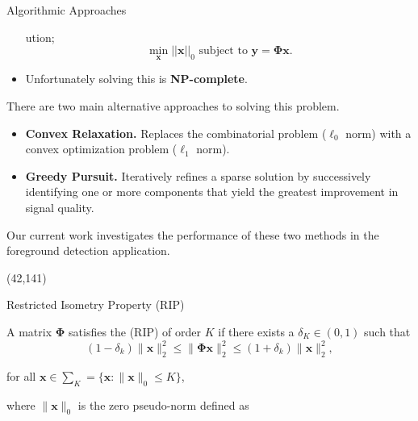 \documentclass[final]{beamer}
\begin{document}
\begin{frame}{}
\begin{textblock}{36}
\begin{block}{Algorithmic Approaches}
\begin{itemize}
ution;  
\begin{equation*}
  \label{eq:4}
 \min_{\boldsymbol{x}} ||\boldsymbol{x}||_0 \text{ subject to } \boldsymbol{y} = \boldsymbol{\Phi} \boldsymbol{x}.
\end{equation*}


\item Unfortunately solving this is \textcolor{likePurple}{\textbf{NP-complete}}.
\end{itemize}

\vspace{1cm}

There are two main alternative approaches to solving this problem. 
\begin{itemize}
\item \textcolor{likePurple}{\textbf{Convex Relaxation. }}
\newline Replaces the combinatorial problem ($\ell_0$ norm) with a convex optimization problem  ($\ell_1$ norm).  

\item \textcolor{likePurple}{\textbf{Greedy Pursuit.}}
\newline Iteratively refines a sparse solution by successively identifying one or more components that yield the greatest improvement in signal quality.
\end{itemize}

\vspace{1.5cm}
Our current work investigates the performance of these two methods in the foreground detection application. 
  \end{block}
\end{textblock}

\begin{textblock}{36}(42,141)
  \begin{block}{Restricted Isometry Property (RIP)}
     
 A matrix $\boldsymbol{\Phi}$ satisfies the (RIP) of order $K$ if there exists a $\delta_K  \in (0,1)$ such that 
\begin{equation*}
  \label{eq:40}
  (1 - \delta_k)\|\boldsymbol{x}\|^2_2 \leq\|\boldsymbol{\Phi} \boldsymbol{x}\|^2_2 \leq (1 + \delta_k)\|\boldsymbol{x}\|^2_2,
\end{equation*}

for all $\boldsymbol{x} \in \sum_K = \{\boldsymbol{x}:\|\boldsymbol{x}\|_0 \leq K\} $, \newline

where $\|\boldsymbol{x}\|_0$ is the zero pseudo-norm defined as


\end{block}
\end{textblock}
\end{frame}
\end{document}
